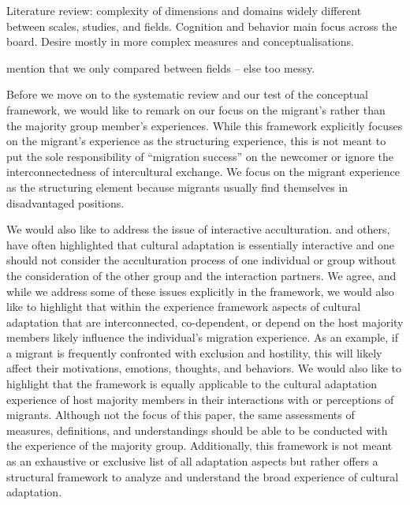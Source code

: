 \documentclass[man, 12pt, a4paper]{apa7}
\begin{document}
Literature review: complexity of dimensions and domains widely different between scales, studies, and fields. Cognition and behavior main focus across the board. Desire mostly in more complex measures and conceptualisations.

mention that we only compared between fields -- else too messy.

Before we move on to the systematic review and our test of the conceptual framework, we would like to remark on our focus on the migrant's rather than the majority group member's experiences. 
While this framework explicitly focuses on the migrant's experience as the structuring experience, this is not meant to put the sole responsibility of ``migration success'' on the newcomer or ignore the interconnectedness of intercultural exchange. We focus on the migrant experience as the structuring element because migrants usually find themselves in disadvantaged positions. 

We would also like to address the issue of interactive acculturation. \citet{Bourhis1997a} and others, have often highlighted that cultural adaptation is essentially interactive and one should not consider the acculturation process of one individual or group without the consideration of the other group and the interaction partners. We agree, and while we address some of these issues explicitly in the framework, we would also like to highlight that within the experience framework aspects of cultural adaptation that are interconnected, co-dependent, or depend on the host majority members likely influence the individual's migration experience. As an example, if a migrant is frequently confronted with exclusion and hostility, this will likely affect their motivations, emotions, thoughts, and behaviors. 
We would also like to highlight that the framework is equally applicable to the cultural adaptation experience of host majority members in their interactions with or perceptions of migrants. Although not the focus of this paper, the same assessments of measures, definitions, and understandings should be able to be conducted with the experience of the majority group.
Additionally, this framework is not meant as an exhaustive or exclusive list of all adaptation aspects but rather offers a structural framework to analyze and understand the broad experience of cultural adaptation.
\end{document}
